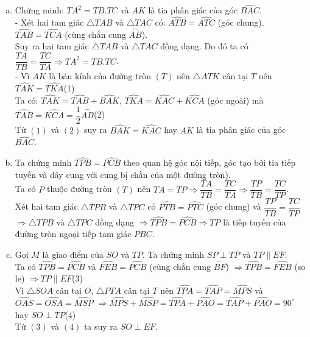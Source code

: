 \begin{ex}
{	\begin{enumerate}[a)]
		\item Chứng minh: $TA^2=TB.TC$ và $AK$ là tia phân giác của góc $\widehat{BAC}$.\\
		- Xét hai tam giác $\triangle TAB$ và $\triangle TAC$ có: $\widehat{ATB}=\widehat{ATC}$ (góc chung). $\widehat{TAB}=\widehat{TCA}$ (cùng chắn cung $\overset\frown{AB}$).\\
		Suy ra hai tam giác $\triangle TAB$ và $\triangle TAC$ đồng dạng. Do đó ta có $\dfrac{TA}{TB}=\dfrac{TC}{TA}\Rightarrow TA^2=TB.TC$.\\
		- Vì $AK$ là bán kính của đường tròn $(T)$ nên $\triangle ATK$ cân tại $T$ nên $\widehat{TAK}=\widehat{TKA}$\quad(1)\\
		Ta có: $\widehat{TAK}=\widehat{TAB}+\widehat{BAK}$, $\widehat{TKA}=\widehat{KAC}+\widehat{KCA}$ (góc ngoài) mà $\widehat{TAB}=\widehat{KCA}=\dfrac{1}{2}\overset\frown{AB}$\quad(2)\\
		Từ $(1)$ và $(2)$ suy ra $\widehat{BAK}=\widehat{KAC}$ hay $AK$ là tia phân giác của góc $\widehat{BAC}$.
		\item Ta chứng minh $\widehat{TPB}=\widehat{PCB}$ theo quan hệ góc nội tiếp, góc tạo bởi tia tiếp tuyến và dây cung với cung bị chắn của một đường tròn).\\
		Ta có $P$ thuộc đường tròn $(T)$ nên $TA=TP\Rightarrow \dfrac{TA}{TB}=\dfrac{TC}{TA}\Rightarrow \dfrac{TP}{TB}=\dfrac{TC}{TP}$.\\
		Xét hai tam giác $\triangle TPB$ và $\triangle TPC$ có $\widehat{PTB}=\widehat{PTC}$ (góc chung) và $\dfrac{TP}{TB}=\dfrac{TC}{TP}$\\
		$\Rightarrow \triangle TPB$ và $\triangle TPC$ đồng dạng $\Rightarrow \widehat{TPB}=\widehat{PCB}\Rightarrow TP$ là tiếp tuyến của đường tròn ngoại tiếp tam giác $PBC$.
		\item Gọi $M$ là giao điểm của $SO$ và $TP$. Ta chứng minh $SP\perp TP$ và $TP\parallel EF$.\\
		Ta có $\widehat{TPB}=\widehat{PCB}$ và $\widehat{FEB}=\widehat{PCB}$ (cùng chắn cung $\overset\frown {BF}$) $\Rightarrow \widehat{TPB}=\widehat{FEB}$ (so le) $\Rightarrow TP\parallel EF$\quad(3)\\
		Vì $\triangle SOA$ cân tại $O$, $\triangle PTA$ cân tại $T$ nên $\widehat{TPA}=\widehat{TAP}=\widehat{MPS}$ và $\widehat{OAS}=\widehat{OSA}=\widehat{MSP}$ $\Rightarrow \widehat{MPS}+\widehat{MSP}=\widehat{TPA}+\widehat{PAO}=\widehat{TAP}+\widehat{PAO}=90^{\circ}$ hay $SO\perp TP$\quad(4)\\
		Từ $(3)$ và $(4)$ ta suy ra $SO\perp EF$.
		\end{enumerate}
}
\end{ex}

